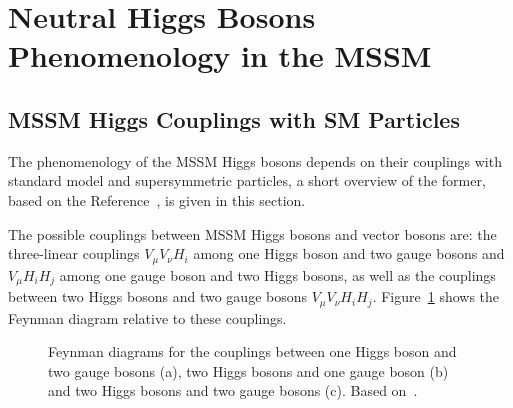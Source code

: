 \section{Neutral Higgs Bosons Phenomenology in the MSSM}\label{sec:pheno}

\subsection{MSSM Higgs Couplings with SM Particles}\label{sec:couplings}
The phenomenology of the MSSM Higgs bosons depends on their couplings with standard model and supersymmetric particles, 
a short overview of the former, based on the Reference~\cite{Djuadi}, is given in this section.

The possible couplings between MSSM Higgs bosons and vector bosons 
are: the three-linear couplings $V_{\mu}V_{\nu}H_i$ among one Higgs boson and two gauge bosons and $V_{\mu}H_{i}H_j$ among one gauge boson and two Higgs bosons,
as well as the couplings between two Higgs bosons and two gauge bosons $V_{\mu}V_{\nu}H_iH_j$. Figure~\ref{fig:couplings} shows the Feynman diagram 
relative to these couplings.
\begin{figure}[tp]
     \begin{center}
     	\hspace{0.5cm}
     	\hspace{0.5cm}
     \end{center}
   \label{fig:couplings}
    \caption{Feynman diagrams for the couplings between one Higgs boson and two gauge bosons (a), two Higgs bosons and one gauge boson (b)
		and two Higgs bosons and two gauge bosons (c). Based on~\cite{Djuadi}. }
\end{figure}
